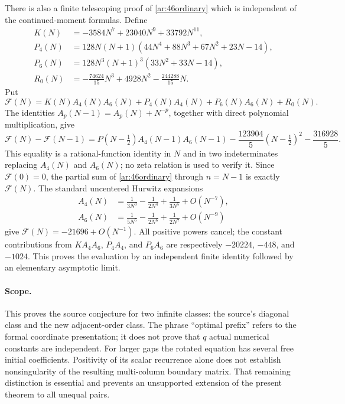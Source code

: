 \documentclass[11pt,a4paper]{article}
\numberwithin{equation}{section}
\theoremstyle{definition}
\theoremstyle{remark}
\begin{document}
There is also a finite telescoping proof of \eqref{ar:46ordinary}
which is independent of the continued-moment formulas. Define
\begin{align*}
 K(N)&=-3584N^7+23040N^9+33792N^{11},\\
 P_4(N)&=128N(N+1)
       (44N^4+88N^3+67N^2+23N-14),\\
 P_6(N)&=128N^3(N+1)^3(33N^2+33N-14),\\
 R_0(N)&=-\frac{74624}{15}N^3+4928N^2-\frac{244288}{15}N.
\end{align*}
Put
\[
 \mathcal F(N)=K(N)A_4(N)A_6(N)
      +P_4(N)A_4(N)+P_6(N)A_6(N)+R_0(N).
\]
The identities $A_p(N-1)=A_p(N)+N^{-p}$, together with direct
polynomial multiplication, give
\begin{equation}\label{ar:46telescoping}
 \mathcal F(N)-\mathcal F(N-1)
  =P(N-\tfrac12)A_4(N-1)A_6(N-1)
      -\frac{123904}{5}(N-\tfrac12)^2-\frac{316928}{5}.
\end{equation}
This equality is a rational-function identity in $N$ and in two
indeterminates replacing $A_4(N)$ and $A_6(N)$; no zeta relation is
used to verify it. Since $\mathcal F(0)=0$, the partial sum of
\eqref{ar:46ordinary} through $n=N-1$ is exactly $\mathcal F(N)$.
The standard uncentered Hurwitz expansions
\[
 \begin{split}
 A_4(N)&=\frac1{3N^3}-\frac1{2N^4}+\frac1{3N^5}+O(N^{-7}),\\
 A_6(N)&=\frac1{5N^5}-\frac1{2N^6}+\frac1{2N^7}+O(N^{-9})
 \end{split}
\]
give $\mathcal F(N)=-21696+O(N^{-1})$. All positive powers
cancel; the constant contributions from $KA_4A_6$, $P_4A_4$, and
$P_6A_6$ are respectively $-20224$, $-448$, and $-1024$.
This proves the evaluation by an independent finite identity followed
by an elementary asymptotic limit.

\paragraph{Scope.}
This proves the source conjecture for two infinite classes: the source's
diagonal class and the new adjacent-order class. The phrase ``optimal
prefix'' refers to the formal coordinate presentation; it does not
prove that $q$ actual numerical constants are independent. For larger
gaps the rotated equation has several free initial coefficients.
Positivity of its scalar recurrence alone does not establish
nonsingularity of the resulting multi-column boundary matrix. That
remaining distinction is essential and prevents an unsupported
extension of the present theorem to all unequal pairs.
\end{document}
